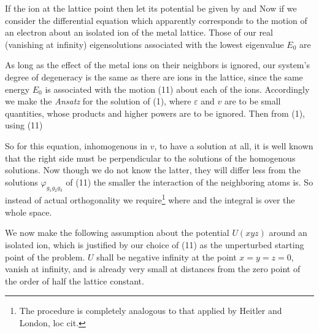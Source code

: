 \begin{paper}{1}
If the ion at the lattice point
then let its potential be given by
and
Now if we consider the differential equation
which apparently corresponds to the motion of an electron about an isolated ion of the metal lattice. Those of our real (vanishing at infinity) eigensolutions associated with the lowest eigenvalue $E_0$ are

As long as the effect of the metal ions on their neighbors is ignored, our system's degree of degeneracy is the same as there are ions in the lattice, since the same energy $E_0$ is associated with the motion (11) about each of the ions. Accordingly we make the \textit{Ansatz}
for the solution of (1), where $\varepsilon$ and $v$ are to be small quantities, whose products and higher powers are to be ignored. Then from (1), using (11)

So for this equation, inhomogenous in $v$, to have a solution at all, it is well known that the right side must be perpendicular to the solutions of the homogenous solutions. Now though we do not know the latter, they will differ less from the solutions $\varphi_{g_1g_2g_3}$ of (11) the smaller the interaction of the neighboring atoms is. So instead of actual orthogonality we require\footnote{The procedure is completely analogous to that applied by Heitler and London, loc cit.}
where
and the integral is over the whole space.

We now make the following assumption about the potential $U(xyz)$ around an isolated ion, which is justified by our choice of (11) as the unperturbed starting point of the problem. $U$ shall be negative infinity at the point $x=y=z=0$, vanish at infinity, and is already very small at distances from the zero point of the order of half the lattice constant.


\end{paper}
